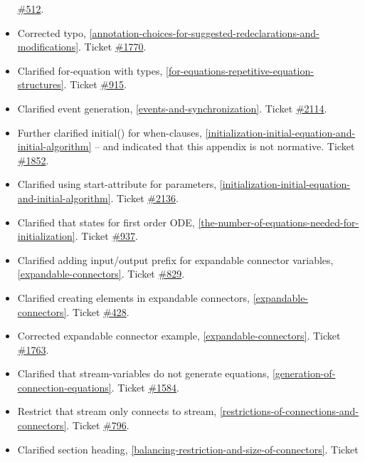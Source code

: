 \begin{itemize}
  \href{https://trac.modelica.org/Modelica/ticket/512}{\#512}.
\item
  Corrected typo, \autoref{annotation-choices-for-suggested-redeclarations-and-modifications}. Ticket
  \href{https://trac.modelica.org/Modelica/ticket/1770}{\#1770}.
\item
  Clarified for-equation with types, \autoref{for-equations-repetitive-equation-structures}. Ticket
  \href{https://trac.modelica.org/Modelica/ticket/915}{\#915}.
\item
  Clarified event generation, \autoref{events-and-synchronization}. Ticket
  \href{https://trac.modelica.org/Modelica/ticket/2114}{\#2114}.
\item
  Further clarified initial() for when-clauses, \autoref{initialization-initial-equation-and-initial-algorithm} -- and
  indicated that this appendix is not normative. Ticket
  \href{https://trac.modelica.org/Modelica/ticket/1852}{\#1852}.
\item
  Clarified using start-attribute for parameters, \autoref{initialization-initial-equation-and-initial-algorithm}. Ticket
  \href{https://trac.modelica.org/Modelica/ticket/2136}{\#2136}.
\item
  Clarified that states for first order ODE, \autoref{the-number-of-equations-needed-for-initialization}. Ticket
  \href{https://trac.modelica.org/Modelica/ticket/937}{\#937}.
\item
  Clarified adding input/output prefix for expandable connector
  variables, \autoref{expandable-connectors}. Ticket
  \href{https://trac.modelica.org/Modelica/ticket/829}{\#829}.
\item
  Clarified creating elements in expandable connectors, \autoref{expandable-connectors}.
  Ticket \href{https://trac.modelica.org/Modelica/ticket/428}{\#428}.
\item
  Corrected expandable connector example, \autoref{expandable-connectors}. Ticket
  \href{https://trac.modelica.org/Modelica/ticket/1763}{\#1763}.
\item
  Clarified that stream-variables do not generate equations, \autoref{generation-of-connection-equations}. Ticket
  \href{https://trac.modelica.org/Modelica/ticket/1584}{\#1584}.
\item
  Restrict that stream only connects to stream, \autoref{restrictions-of-connections-and-connectors}. Ticket
  \href{https://trac.modelica.org/Modelica/ticket/796}{\#796}.
\item
  Clarified section heading, \autoref{balancing-restriction-and-size-of-connectors}. Ticket

\end{itemize}
